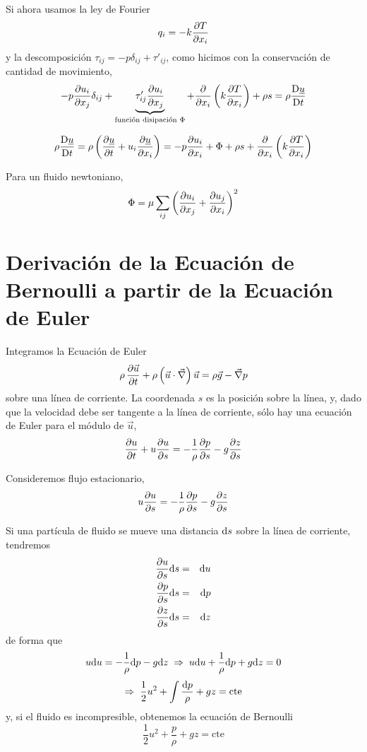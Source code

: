	
	
	Si ahora usamos la ley de Fourier 
	\[
	q_{i}=-k\frac{\partial T}{\partial x_{i}}
	\]
	y la descomposición $\tau_{ij}=-p\delta_{ij}+\tau'_{ij}$, como hicimos
	con la conservación de cantidad de movimiento, 
	\[
	-p\frac{\partial u_{i}}{\partial x_{j}}\delta_{ij}+\underbrace{\tau'_{ij}\frac{\partial u_{i}}{\partial x_{j}}}_{\text{función disipación }\Phi}+\frac{\partial \phantom{}}{\partial x_{i}}\left(k\frac{\partial T}{\partial x_{i}}\right)+\rho s=\rho\frac{\text{D} \underline{u}}{\text{D} t}
	\]
	
	\begin{equation}
		\rho\frac{\text{D} \underline{u}}{\text{D} t}=\rho\left(\frac{\partial \underline{u}}{\partial t}+u_{i}\frac{\partial \underline{u}}{\partial x_{i}}\right)=-p\frac{\partial u_{i}}{\partial x_{i}}+\Phi+\rho s+\frac{\partial \phantom{}}{\partial x_{i}}\left(k\frac{\partial T}{\partial x_{i}}\right)
	\end{equation}
	
	
	Para un fluido newtoniano, 
	\[
	\Phi=\mu\sum_{ij}\left(\frac{\partial u_{i}}{\partial x_{j}}+\frac{\partial u_{j}}{\partial x_{i}}\right)^{2}
	\]

\section{Derivación de la Ecuación de Bernoulli a partir de la Ecuación de Euler}
	
	Integramos la Ecuación de Euler 
	\[
	\rho\,\frac{\partial \vec{u}}{\partial t}+\rho\left(\vec{u}\cdot\vec{\nabla}\right)\vec{u}=\rho\vec{g}-\vec{\nabla}p
	\]
	sobre una línea de corriente. La coordenada $s$ es la posición sobre
	la línea, y, dado que la velocidad debe ser tangente a la línea de
	corriente, sólo hay una ecuación de Euler para el módulo de $\vec{u}$,
	\[
	\frac{\partial u}{\partial t}+u\frac{\partial u}{\partial s}=-\frac{1}{\rho}\frac{\partial p}{\partial s}-g\frac{\partial z}{\partial s}
	\]
	
	Consideremos flujo estacionario, 
	\[
	u\frac{\partial u}{\partial s}=-\frac{1}{\rho}\frac{\partial p}{\partial s}-g\frac{\partial z}{\partial s}
	\]
	
	
	Si una partícula de fluido se mueve una distancia $\text{d} s$ sobre
	la línea de corriente, tendremos 
	\begin{eqnarray*}
		\frac{\partial u}{\partial s}\text{d} s & = & \text{d} u\\
		\frac{\partial p}{\partial s}\text{d} s & = & \text{d} p\\
		\frac{\partial z}{\partial s}\text{d} s & = & \text{d} z
	\end{eqnarray*}
	de forma que 
	\[
	u\text{d} u=-\frac{1}{\rho}\text{d} p-g\text{d} z\;\Rightarrow\;u\text{d} u+\frac{1}{\rho}\text{d} p+g\text{d} z=0
	\]
	\[
	\Rightarrow\;\frac{1}{2}u^{2}+\int\frac{\text{d} p}{\rho}+gz=\text{cte}
	\]
	y, si el fluido es incompresible, obtenemos la ecuación de Bernoulli
	\[
	\boxed{\frac{1}{2}u^{2}+\frac{p}{\rho}+gz=\text{cte}}
	\]
	


